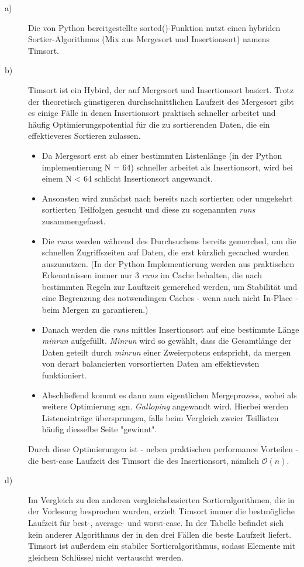\begin{description}
\item[a)] Die von Python bereitgestellte sorted()-Funktion nutzt einen hybriden Sortier-Algorithmus (Mix aus Mergesort und Insertionsort) namens Timsort.
\item[b)]
Timsort ist ein Hybird, der auf Mergesort und Insertionsort basiert. Trotz der theoretisch günstigeren durchschnittlichen Laufzeit des Mergesort gibt es einige Fälle in denen Insertionsort praktisch schneller arbeitet und häufig Optimierungspotential für die zu sortierenden Daten, die ein effektieveres Sortieren zulassen.
\begin{itemize}
\item Da Mergesort erst ab einer bestimmten Listenlänge (in der Python implementierung N = 64) schneller arbeitet als Insertionsort, wird bei einem N < 64 schlicht Insertionsort angewandt.
\item Ansonsten wird zunächst nach bereits nach sortierten oder umgekehrt sortierten Teilfolgen gesucht und diese zu sogenannten \textit{runs} zusammengefasst.
\item Die \textit{runs} werden während des Durchsuchens bereits gemerched, um die schnellen Zugriffszeiten auf Daten, die erst kürzlich gecached wurden auszunutzen. (In der Python Implementierung werden aus praktischen Erkenntnissen immer nur 3 \textit{runs} im Cache behalten, die nach bestimmten Regeln zur Lauftzeit gemerched werden, um Stabilität und eine Begrenzung des notwendingen Caches - wenn auch nicht In-Place - beim Mergen zu garantieren.)
\item Danach werden die \textit{runs} mittles Insertionsort auf eine bestimmte Länge \textit{minrun} aufgefüllt. \textit{Minrun} wird so gewählt, dass die Gesamtlänge der Daten geteilt durch \textit{minrun} einer Zweierpotens entspricht, da mergen von derart balancierten vorsortierten Daten am effektievsten funktioniert.
\item Abschließend kommt es dann zum eigentlichen Mergeprozess, wobei als weitere Optimierung sgn. \textit{Galloping} angewandt wird. Hierbei werden Listeneinträge übersprungen, falls beim Vergleich zweier Teillisten häufig diesselbe Seite "gewinnt".
\end{itemize}
Durch diese Optimierungen ist - neben praktischen performance Vorteilen - die best-case Laufzeit des Timsort die des Insertionsort, nämlich ${\mathcal O (n)}$. 
\item[d)]
Im Vergleich zu den anderen vergleichsbasierten Sortieralgorithmen, die in der Vorlesung besprochen wurden, erzielt Timsort immer die bestmögliche Laufzeit für best-, average- und worst-case. In der Tabelle befindet sich kein anderer Algorithmus der in den drei Fällen die beste Laufzeit liefert. Timsort ist außerdem ein stabiler Sortieralgorithmus, sodass Elemente mit gleichem Schlüssel nicht vertauscht werden. \\

\end{description}
